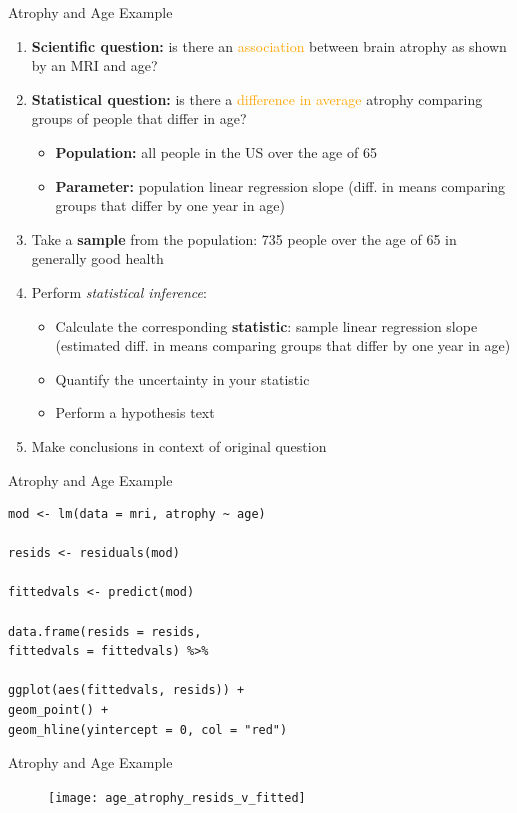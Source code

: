 \documentclass[10pt,t]{beamer}
\begin{document}
\begin{frame}{Atrophy and Age Example}
	\begin{enumerate}
		\item \textbf{Scientific question:} is there an \textcolor{orange}{association} between brain atrophy as shown by an MRI and age?
		\item \textbf{Statistical question:} is there a \textcolor{orange}{difference in average} atrophy comparing groups of people that differ in age? 
		\begin{itemize}
			\item \textbf{Population:} all people in the US over the age of 65
			\item \textbf{Parameter:} population linear regression slope (diff. in means comparing groups that differ by one year in age) 
		\end{itemize}
		\item Take a \textbf{sample} from the population: 735 people over the age of 65 in generally good health 
		\item Perform \textit{statistical inference}:
		\begin{itemize}
			\item Calculate the corresponding \textbf{statistic}: sample linear regression slope (estimated diff. in means comparing groups that differ by one year in age)
			\item Quantify the uncertainty in your statistic
			\item Perform a hypothesis text
		\end{itemize}
		\item Make conclusions in context of original question
	\end{enumerate}
	
\end{frame}

\begin{frame}[fragile]{Atrophy and Age Example}
	\begin{lstlisting}
mod <- lm(data = mri, atrophy ~ age)

resids <- residuals(mod)

fittedvals <- predict(mod)

data.frame(resids = resids,
fittedvals = fittedvals) %>%

ggplot(aes(fittedvals, resids)) +
geom_point() +
geom_hline(yintercept = 0, col = "red") 
\end{lstlisting}
\end{frame}

\begin{frame}{Atrophy and Age Example}
	\begin{figure}
		\centering
		\texttt{[image: age\_atrophy\_resids\_v\_fitted]}
	\end{figure}
\medskip

\end{frame}
\end{document}
